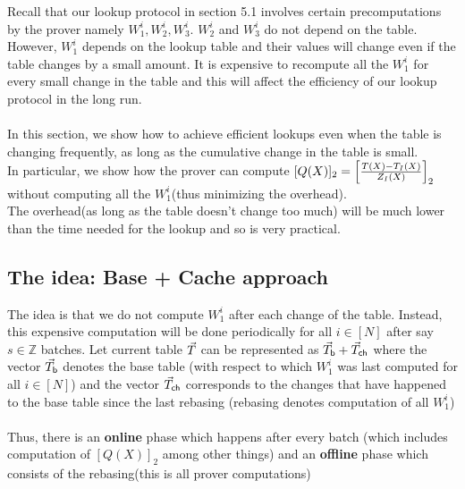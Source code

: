 \newcommand{\eltone}[1]{[#1]_1}
\newcommand{\elttwo}[1]{[#1]_2}
\newcommand{\elt}[1]{[\,{#1}\,]}
\newtheorem{fact}{Fact}[section]

Recall that our lookup protocol in section 5.1 involves certain precomputations by the prover namely $W_1^i, W_2^i, W_3^i$. $W_2^i$ and $W_3^i$ do not depend on the table. However, $W_1^i$ depends on the lookup table and their values will change even if the table changes by a small amount. It is expensive to recompute all the $W_1^i$ for every small change in the table and this will affect the efficiency of our lookup protocol in the long run.\\\\
In this section, we show how to achieve efficient lookups even when the table is changing frequently, as long as the cumulative change in the table is small. \\
In particular, we show how the prover can compute $[Q(X)]_2=\left[{\frac{T(X)-T_I(X)}{Z_I(X)}}\right]_2$ without computing all the $W_1^i$(thus minimizing the overhead).\\
The overhead(as long as the table doesn't change too much) will be much lower than the time needed for the lookup and so is very practical.

\subsection{The idea: Base + Cache approach}

The idea is that we do not compute $W_1^i$ after each change of the table. Instead, this expensive computation will be done periodically for all $i \in [N]$ after say $s \in \mathbb{Z}$ batches.
Let current table $\vec{T}$ can be represented as $\vec{T}_{\mathsf{b}} + \vec{T}_{\mathsf{ch}}$ where the vector
$\vec{T}_{\mathsf{b}}$ denotes the base table (with respect to which $W_1^i$ was last computed for all $i \in [N]$) and the vector $\vec{T}_{\mathsf{ch}}$ corresponds to the changes
that have happened to the base table since the last rebasing (rebasing denotes computation of all $W_1^i$)\\\\
Thus, there is an \textbf{online} phase which happens after every batch (which includes computation of $[Q(X)]_2$ among other things) and an \textbf{offline} phase which consists of the rebasing(this is all prover computations) \\\\




